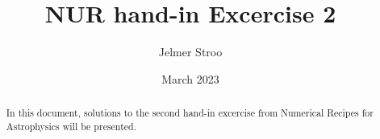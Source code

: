 \documentclass{article}
\title{NUR hand-in Excercise 2}
\author{Jelmer Stroo}
\date{March 2023}
\begin{document}
\maketitle

\begin{abstract}
    In this document, solutions to the second hand-in excercise from Numerical Recipes for Astrophysics will be presented.
\end{abstract}




\end{document}
